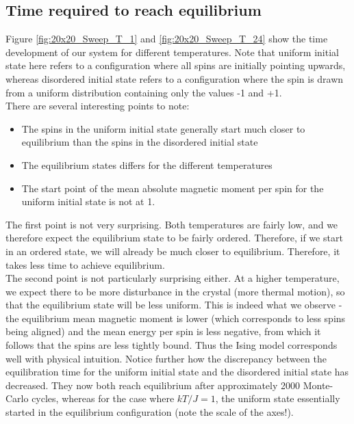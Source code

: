 \documentclass[a4paper, 10pt]{article}
\begin{document}
\subsection{Time required to reach equilibrium}
Figure \ref{fig:20x20_Sweep_T_1} and \ref{fig:20x20_Sweep_T_24} show the time development of our system for different temperatures. Note that uniform initial state here refers to a configuration where all spins are initially pointing upwards, whereas disordered initial state refers to a configuration where the spin is drawn from a uniform distribution containing only the values -1 and +1.\\
\linebreak
There are several interesting points to note:
\begin{itemize}
\item The spins in the uniform initial state generally start much closer to equilibrium than the spins in the disordered initial state
\item The equilibrium states differs for the different temperatures
\item The start point of the mean absolute magnetic moment per spin for the uniform initial state is not at 1.
\end{itemize}
The first point is not very surprising. Both temperatures are fairly low, and we therefore expect the equilibrium state to be fairly ordered. Therefore, if we start in an ordered state, we will already be much closer to equilibrium. Therefore, it takes less time to achieve equilibrium. \\
\linebreak
The second point is not particularly surprising either. At a higher temperature, we expect there to be more disturbance in the crystal (more thermal motion), so that the equilibrium state will be less uniform. This is indeed what we observe - the equilibrium mean magnetic moment is lower (which corresponds to less spins being aligned) and the mean energy per spin is less negative, from which it follows that the spins are less tightly bound. Thus the Ising model corresponds well with physical intuition. Notice further how the discrepancy between the equilibration time for the uniform initial state and the disordered initial state has decreased. They now both reach equilibrium after approximately 2000 Monte-Carlo cycles, whereas for the case where $kT/J=1$, the uniform state essentially started in the equilibrium configuration (note the scale of the axes!).\\
\linebreak
\end{document}
